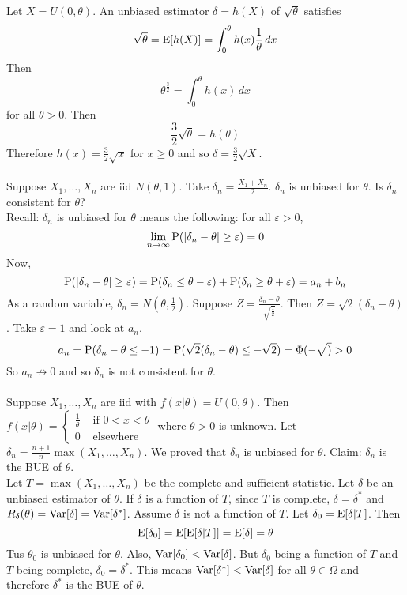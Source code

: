 \documentclass[12pt]{article}
\begin{document}
Let $X = U(0,\theta)$. An unbiased estimator $\delta = h(X)$ of $\sqrt{\theta}$ satisfies $$ \sqrt{\theta} = \mathrm{E}[ h(X) ] = \int_0^\theta h(x) \frac{1}{\theta} \, dx $$ 
Then $$ \theta^{\frac{3}{2}} = \int_0^\theta h(x) \, dx $$ for all $\theta > 0$. Then $$ \frac{3}{2}\sqrt{\theta} = h(\theta)$$ Therefore $h(x) = \frac{3}{2}\sqrt{x}$ for $x \geq 0$ and so $\delta = \frac{3}{2} \sqrt{X}$. \\~\\
Suppose $X_1,\dots,X_n$ are iid $N(\theta, 1)$. Take $\delta_n = \frac{X_1 + X_n}{2}$. $\delta_n$ is unbiased for $\theta$. Is $\delta_n$ consistent for $\theta$? \\
Recall: $\delta_n$ is unbiased for $\theta$ means the following: for all $\varepsilon > 0$, $$ \lim_{n\to\infty} \mathrm{P}(  \abs{\delta_n - \theta} \geq \varepsilon ) = 0 $$ 
Now, $$ \mathrm{P}( \abs{\delta_n - \theta} \geq \varepsilon ) = \mathrm{P}( \delta_n \leq \theta - \varepsilon ) + \mathrm{P}( \delta_n \geq \theta + \varepsilon ) = a_n + b_n $$ 
As a random variable, $\delta_n = N(\theta, \frac{1}{2})$. Suppose $Z = \frac{\delta_n - \theta}{\sqrt{\frac{1}{2}}}$. Then $Z = \sqrt{2}(\delta_n - \theta)$. Take $\varepsilon = 1$ and look at $a_n$. $$ a_n = \mathrm{P}( \delta_n - \theta \leq -1 ) = \mathrm{P}( \sqrt{2}(\delta_n - \theta) \leq -\sqrt{2} ) = \Phi(-\sqrt) > 0 $$ So $a_n \not\to 0$ and so $\delta_n$ is not consistent for $\theta$. \\~\\
Suppose $X_1,\dots,X_n$ are iid with $f(x|\theta) = U(0,\theta)$. Then $f(x|\theta) = \begin{cases} \frac{1}{\theta} &\text{ if } 0 < x < \theta \\ 0 &\text{ elsewhere } \end{cases}$ where $\theta > 0$ is unknown. Let $\delta_n = \frac{n+1}{n}\max(X_1,\dots,X_n)$. We proved that $\delta_n$ is unbiased for $\theta$. Claim: $\delta_n$ is the BUE of $\theta$. \\
Let $T = \max(X_1,\dots,X_n)$ be the complete and sufficient statistic. Let $\delta$ be an unbiased estimator of $\theta$. If $\delta$ is a function of $T$, since $T$ is complete, $\delta = \delta^*$ and $R_\delta(\theta) = \mathrm{Var}[ \delta ] = \mathrm{Var}[ \delta^* ]$. Assume $\delta$ is not a function of $T$. Let $\delta_0 = \mathrm{E}[ \delta | T ]$. Then $$\mathrm{E}[ \delta_0 ] = \mathrm{E}[ \mathrm{E}[ \delta | T ] ] = \mathrm{E}[ \delta ] = \theta$$ Tus $\theta_0$ is unbiased for $\theta$. Also, $\mathrm{Var}[ \delta_0 ] < \mathrm{Var}[ \delta ]$. But $\delta_0$ being a function of $T$ and $T$ being complete, $\delta_0 = \delta^*$. This means $\mathrm{Var}[ \delta^* ] < \mathrm{Var}[ \delta ]$ for all $\theta \in \Omega$ and therefore $\delta^*$ is the BUE of $\theta$. \\~\\
\end{document}
